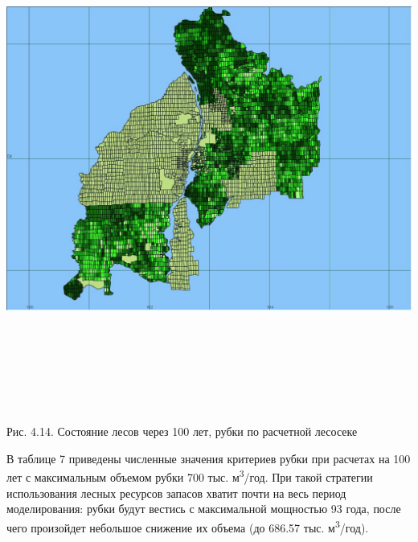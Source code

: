 \documentclass{article}
\begin{document}
\begin{center}
\includegraphics[width=622pt, height=467pt, keepaspectratio=true]{asyaDisser9_3-fig025.png}

Рис. 4.14. Состояние лесов через 100 лет, рубки по 
расчетной лесосеке
\end{center}

В таблице 7 приведены численные значения критериев 
рубки при расчетах на 100 лет с максимальным 
объемом рубки 700 тыс. м\textsuperscript{3}/год. При такой 
стратегии использования лесных ресурсов запасов 
хватит почти на весь период моделирования: 
рубки будут вестись с максимальной мощностью 
93 года, после чего произойдет небольшое снижение 
их объема (до 686.57 тыс. м\textsuperscript{3}/год). 
\end{document}
